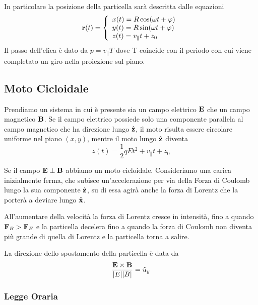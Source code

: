 
In particolare la posizione della particella sar\`a descritta dalle equazioni
\begin{equation*}
	\bold{r}(t) = \left \{ \begin{array}{l}
		x(t) = R\cos(\omega t + \varphi)\\
		y(t) = R\sin(\omega t + \varphi)\\
		z(t) = v_{\parallel} t + z_0
	\end{array}\right.
\end{equation*}
Il passo dell'elica \`e dato da $p = v_{\parallel}T$ dove T coincide con il periodo con cui viene completato un giro nella proiezione sul piano.

\subsection{Moto Cicloidale}

Prendiamo un sistema in cui \`e presente sia un campo elettrico $\bold{E}$ che un campo magnetico $\bold{B}$. Se il campo elettrico possiede solo una componente parallela al campo magnetico che ha direzione lungo $\hat{\bold{z}}$, il moto risulta essere circolare uniforme nel piano $(x,y)$, mentre il moto lungo $\hat{\bold{z}}$ diventa 
\begin{equation*}
	z(t) = \frac{1}{2}qEt^2 + v_{\parallel}t + z_0
\end{equation*}

Se il campo $\bold{E} \perp \bold{B}$ abbiamo un moto cicloidale. Consideriamo una carica inizialmente ferma, che subisce un'accelerazione per via della Forza di Coulomb lungo la sua componente $\hat{\bold{z}}$, su di essa agir\`a anche la forza di Lorentz che la porter\`a a deviare lungo $\hat{\bold{x}}$. 

All'aumentare della velocit\`a la  forza di Lorentz cresce in intensit\`a, fino a quando $\bold{F}_{B} > \bold{F}_{E}$ e la particella decelera fino a quando la forza di Coulomb non diventa pi\`u grande di quella di Lorentz e la particella torna a salire.

La direzione dello spostamento della particella \`e data da 
\begin{equation*}
	\frac{\bold{E} \times \bold{B}}{|E||B|} = \hat{u}_y
\end{equation*} 

\subsubsection{Legge Oraria}

